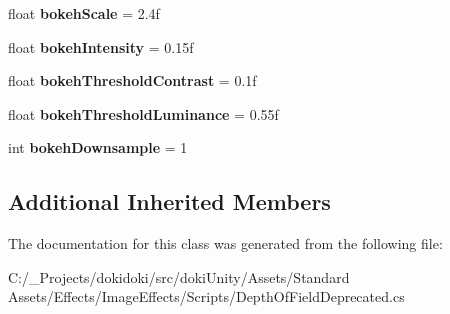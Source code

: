 \begin{DoxyCompactItemize}
\item 
float {\bfseries bokeh\+Scale} = 2.\+4f\hypertarget{class_unity_standard_assets_1_1_image_effects_1_1_depth_of_field_deprecated_a4126e6aa3ab234096a444278a717bf93}{}\label{class_unity_standard_assets_1_1_image_effects_1_1_depth_of_field_deprecated_a4126e6aa3ab234096a444278a717bf93}

\item 
float {\bfseries bokeh\+Intensity} = 0.\+15f\hypertarget{class_unity_standard_assets_1_1_image_effects_1_1_depth_of_field_deprecated_a2d6cad3430448a6d26b8fa1c48007db5}{}\label{class_unity_standard_assets_1_1_image_effects_1_1_depth_of_field_deprecated_a2d6cad3430448a6d26b8fa1c48007db5}

\item 
float {\bfseries bokeh\+Threshold\+Contrast} = 0.\+1f\hypertarget{class_unity_standard_assets_1_1_image_effects_1_1_depth_of_field_deprecated_a068787ec057a885c83c77c85e2d89e92}{}\label{class_unity_standard_assets_1_1_image_effects_1_1_depth_of_field_deprecated_a068787ec057a885c83c77c85e2d89e92}

\item 
float {\bfseries bokeh\+Threshold\+Luminance} = 0.\+55f\hypertarget{class_unity_standard_assets_1_1_image_effects_1_1_depth_of_field_deprecated_a6c9aaaa9c8965e6bab4524e1a41d6083}{}\label{class_unity_standard_assets_1_1_image_effects_1_1_depth_of_field_deprecated_a6c9aaaa9c8965e6bab4524e1a41d6083}

\item 
int {\bfseries bokeh\+Downsample} = 1\hypertarget{class_unity_standard_assets_1_1_image_effects_1_1_depth_of_field_deprecated_aec24f4157afedaad519f95a466e449f2}{}\label{class_unity_standard_assets_1_1_image_effects_1_1_depth_of_field_deprecated_aec24f4157afedaad519f95a466e449f2}

\end{DoxyCompactItemize}
\subsection*{Additional Inherited Members}


The documentation for this class was generated from the following file\+:\begin{DoxyCompactItemize}
\item 
C\+:/\+\_\+\+Projects/dokidoki/src/doki\+Unity/\+Assets/\+Standard Assets/\+Effects/\+Image\+Effects/\+Scripts/Depth\+Of\+Field\+Deprecated.\+cs\end{DoxyCompactItemize}
